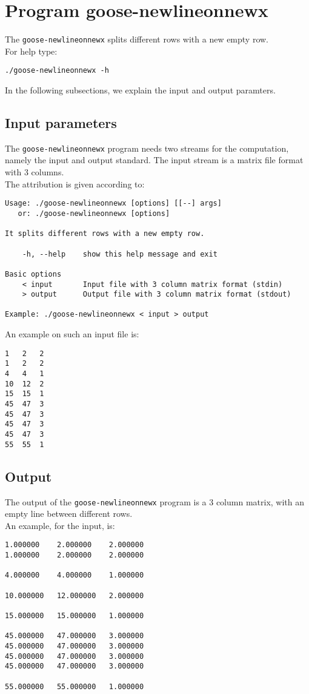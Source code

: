 \section{Program goose-newlineonnewx}
The \texttt{goose-newlineonnewx} splits different rows with a new empty row.\\
For help type:
\begin{lstlisting}
./goose-newlineonnewx -h
\end{lstlisting}
In the following subsections, we explain the input and output paramters.

\subsection*{Input parameters}

The \texttt{goose-newlineonnewx} program needs two streams for the computation, namely the input and output standard. The input stream is a matrix file format with 3 columns.\\
The attribution is given according to:
\begin{lstlisting}
Usage: ./goose-newlineonnewx [options] [[--] args]
   or: ./goose-newlineonnewx [options]

It splits different rows with a new empty row.

    -h, --help    show this help message and exit

Basic options
    < input       Input file with 3 column matrix format (stdin)
    > output      Output file with 3 column matrix format (stdout)

Example: ./goose-newlineonnewx < input > output
\end{lstlisting}
An example on such an input file is:
\begin{lstlisting}
1	2	2
1	2	2
4	4	1
10	12	2
15	15	1
45	47	3
45	47	3
45	47	3
45	47	3
55	55	1
\end{lstlisting}

\subsection*{Output}
The output of the \texttt{goose-newlineonnewx} program is a 3 column matrix, with an empty line between different rows.\\
An example, for the input, is:
\begin{lstlisting}
1.000000	2.000000	2.000000
1.000000	2.000000	2.000000

4.000000	4.000000	1.000000

10.000000	12.000000	2.000000

15.000000	15.000000	1.000000

45.000000	47.000000	3.000000
45.000000	47.000000	3.000000
45.000000	47.000000	3.000000
45.000000	47.000000	3.000000

55.000000	55.000000	1.000000
\end{lstlisting}
